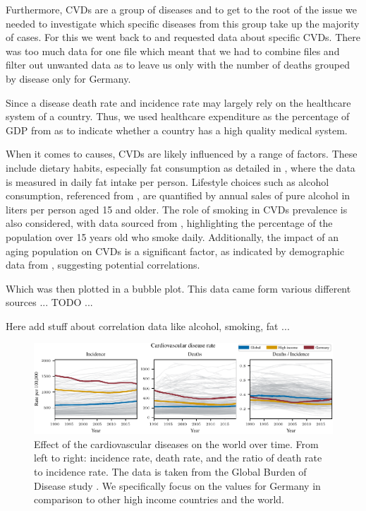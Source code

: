 Furthermore, CVDs are a group of diseases and to get to the root of the issue we needed to investigate which specific diseases from this group take up the majority of cases. For this we went back to \citep{GBD2019} and requested data about specific CVDs. There was too much data for one file which meant that we had to combine files and filter out unwanted data as to leave us only with the number of deaths grouped by disease only for Germany. 

Since a disease death rate and incidence rate may largely rely on the healthcare system of a country. Thus, we used healthcare expenditure as the percentage of GDP from \citep{health_expenditure} as to indicate whether a country has a high quality medical system.

When it comes to causes, CVDs are likely influenced by a range of factors. These include dietary habits, especially fat consumption as detailed in \citep{fat_consumption}, where the data is measured in daily fat intake per person. Lifestyle choices such as alcohol consumption, referenced from \citep{alcohol_consumption}, are quantified by annual sales of pure alcohol in liters per person aged 15 and older. The role of smoking in CVDs prevalence is also considered, with data sourced from \citep{smoking}, highlighting the percentage of the population over 15 years old who smoke daily. Additionally, the impact of an aging population on CVDs is a significant factor, as indicated by demographic data from \citep{age}, suggesting potential correlations.



Which was then plotted in a bubble plot. This data came form various different sources ... TODO ...

Here add stuff about correlation data like alcohol, smoking, fat ...

\begin{figure}[h]
    \vskip 0.2in
    \centering
    \centerline{\includegraphics[]{fig/fig_cardiovascular_disease_rate.pdf}}
    \caption{Effect of the cardiovascular diseases on the world over time. From left to right: incidence rate, death rate, 
    and the ratio of death rate to incidence rate. The data is taken from the Global Burden of Disease study \citep{GBD2019}. We specifically focus on the values 
    for Germany in comparison to other high income countries and the world.}
    \label{Cardiovascular diseases over time}
\end{figure}